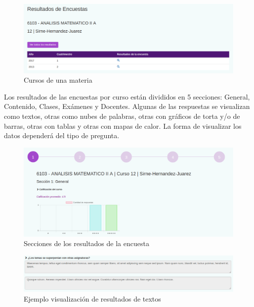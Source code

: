 \documentclass[a4paper]{article}
\begin{document}
\begin{figure}[H]
\centering
\includegraphics[scale=0.35]{Imagenes/listado_resultados_encuesta_curso.png}\par
\caption{Cursos de una materia}
\end{figure}

Los resultados de las encuestas por curso están divididos en 5 secciones: General, Contenido, Clases, Exámenes y Docentes. Algunas de las respuestas se visualizan como textos, otras como nubes de palabras, otras con gráficos de torta y/o de barras, otras con tablas y otras con mapas de calor. La forma de visualizar los datos dependerá del tipo de pregunta.

\begin{figure}[H]
\centering
\includegraphics[scale=0.3]{Imagenes/secciones_resultados_encuesta.png}\par
\caption{Secciones de los resultados de la encuesta}
\end{figure}

\begin{figure}[H]
\centering
\includegraphics[scale=0.35]{Imagenes/resultados_texto.png}\par
\caption{Ejemplo visualización de resultados de textos}
\end{figure}
\end{document}

